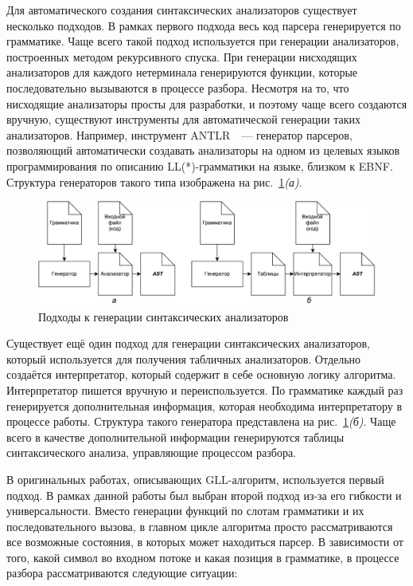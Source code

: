 Для автоматического создания синтаксических анализаторов существует несколько подходов. В рамках первого подхода весь код парсера генерируется по грамматике. Чаще всего такой подход используется при генерации анализаторов, построенных методом рекурсивного спуска. При генерации нисходящих анализаторов для каждого нетерминала генерируются функции, которые последовательно вызываются в процессе разбора. Несмотря на то, что нисходящие анализаторы просты для разработки, и поэтому чаще всего создаются вручную, существуют инструменты для автоматической генерации таких анализаторов. Например, инструмент ANTLR~\cite{antlr}~--- генератор парсеров, позволяющий автоматически создавать анализаторы на одном из целевых языков программирования по описанию LL(*)-грамматики на языке, близком к EBNF. Структура генераторов такого типа изображена на рис.~\ref{genTypes}{\it (а)}.

\begin{figure}
 \centering
 \includegraphics[width=\textwidth]{Ragozina/pics/GeneratorTypes.pdf}
 \caption{Подходы к генерации синтаксических анализаторов}
 \label{genTypes}
\end{figure}

Существует ещё один подход для генерации синтаксических анализаторов, который используется для получения табличных анализаторов. Отдельно создаётся интерпретатор, который содержит в себе основную логику алгоритма. Интерпретатор пишется вручную и переиспользуется. По грамматике каждый раз генерируется дополнительная информация, которая необходима интерпретатору в процессе работы. Структура такого генератора представлена на рис.~\ref{genTypes}{\it (б)}. Чаще всего в качестве дополнительной информации генерируются таблицы синтаксического анализа, управляющие процессом разбора.

В оригинальных работах, описывающих GLL-алгоритм, используется первый подход. В рамках данной работы был выбран второй подход из-за его гибкости и универсальности. Вместо генерации функций по слотам грамматики и их последовательного вызова, в главном цикле алгоритма просто рассматриваются все возможные состояния, в которых может находиться парсер. В зависимости от того, какой символ во входном потоке и какая позиция в грамматике, в процессе разбора рассматриваются следующие ситуации:

